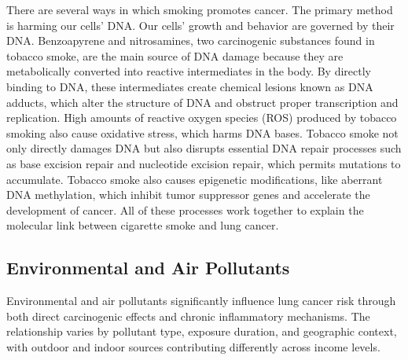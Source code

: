 There are several ways in which smoking promotes cancer. The primary method is harming our cells' 
DNA. Our cells' growth and behavior are governed by their DNA. Benzoapyrene and nitrosamines, two 
carcinogenic substances found in tobacco smoke, are the main source of DNA damage because they are 
metabolically converted into reactive intermediates in the body. By directly binding to DNA, these 
intermediates create chemical lesions known as DNA adducts, which alter the structure of DNA and 
obstruct proper transcription and replication. High amounts of reactive oxygen species (ROS) 
produced by tobacco smoking also cause oxidative stress, which harms DNA bases. Tobacco smoke not 
only directly damages DNA but also disrupts essential DNA repair processes such as base excision 
repair and nucleotide excision repair, which permits mutations to accumulate. Tobacco smoke also 
causes epigenetic modifications, like aberrant DNA methylation, which inhibit tumor suppressor 
genes and accelerate the development of cancer. All of these processes work together to explain the 
molecular link between cigarette smoke and lung cancer.


\subsection{Environmental and Air Pollutants}

Environmental and air pollutants significantly influence lung cancer risk through both direct 
carcinogenic effects and chronic inflammatory mechanisms. The relationship varies by pollutant 
type, exposure duration, and geographic context, with outdoor and indoor sources contributing 
differently across income levels.

